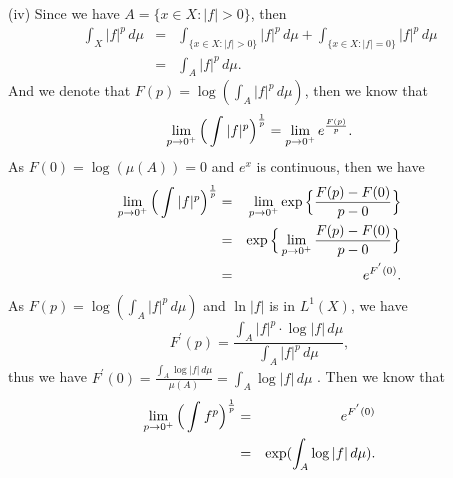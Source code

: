 \documentclass[12pt,a4paper]{ctexart}
\begin{document}
(iv) Since we have $A = \{x \in X: |f| > 0\}$, then
\begin{eqnarray*}
    \int_{X}^{} |f|^{p} \, d \mu & = & \int_{\{x \in X: |f| > 0\}}^{} |f|^{p} \, d \mu + \int_{\{x \in X: |f| = 0\}}^{} |f|^{p} \, d \mu \\
    & = & \int_{A}^{} |f|^{p} \, d \mu.
\end{eqnarray*}
And we denote that $F(p) = \log (\int_{A}^{} |f|^{p} \, d \mu)$, then we know that
\begin{equation*}
    \lim_{p \to 0^{+}} \Big{(} \int_{}^{} |f|^{p} \Big{)}^{\frac{1}{p}} = \lim_{p \to 0^{+}} e^{\frac{F(p)}{p}}.
\end{equation*}
As $F(0) = \log(\mu(A)) = 0$ and $e^{x}$ is continuous, then we have
\begin{eqnarray*}
    \lim_{p \to 0^{+}} \Big{(} \int_{}^{} |f|^{p} \Big{)}^{\frac{1}{p}} & = & \lim_{p \to 0^{+}} \exp \Big{\{} \frac{F(p) - F(0)}{p - 0} \Big{\}} \\
    & = & \exp \Big{\{} \lim_{p \to 0^{+}} \frac{F(p) - F(0)}{p - 0} \Big{\}} \\
    & = & e^{F^{'}(0)}.
\end{eqnarray*}
As $F(p) = \log (\int_{A}^{} |f|^{p} \, d \mu)$ and $\ln |f|$ is in $L^{1}(X)$, we have 
\begin{equation*}
    F^{'}(p) = \frac{\int_{A}^{} |f|^{p} \cdot \log |f| \, d \mu}{\int_{A}^{} |f|^{p} \, d \mu},
\end{equation*}
thus we have $F^{'}(0) = \frac{\int_{A}^{} \log |f| \, d \mu}{\mu(A)} = \int_{A}^{} \log |f| \, d \mu$ . Then we know that
\begin{eqnarray*}
    \lim_{p \to 0^{+}} \Big{(} \int_{}^{} f^{p} \Big{)}^{\frac{1}{p}} & = & e^{F^{'}(0)} \\
    & = & \exp (\int_{A}^{} \log |f| \, d \mu).
\end{eqnarray*}







 
\end{document}
